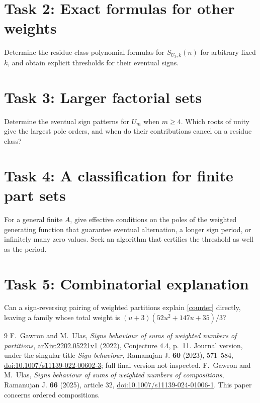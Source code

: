 \documentclass[11pt]{article}
\begin{document}
\section*{Task 2: Exact formulas for other weights}
Determine the residue-class polynomial formulas for
$S_{U_3,k}(n)$ for arbitrary fixed $k$, and obtain explicit thresholds
for their eventual signs.

\section*{Task 3: Larger factorial sets}
Determine the eventual sign patterns for $U_m$ when $m\geq4$.
Which roots of unity give the largest pole orders, and when do
their contributions cancel on a residue class?

\section*{Task 4: A classification for finite part sets}
For a general finite $A$, give effective conditions on the poles
of the weighted generating function that guarantee eventual
alternation, a longer sign period, or infinitely many zero values.
Seek an algorithm that certifies the threshold as well as the period.

\section*{Task 5: Combinatorial explanation}
Can a sign-reversing pairing of weighted partitions explain
\eqref{counter} directly, leaving a family whose total weight is
$(u+3)(52u^2+147u+35)/3$?

\begin{thebibliography}{9}
F.~Gawron and M.~Ulas,
\emph{Signs behaviour of sums of weighted numbers of partitions},
\href{https://arxiv.org/abs/2202.05221}{arXiv:2202.05221v1} (2022),
Conjecture 4.4, p.~11.
Journal version, under the singular title \emph{Sign behaviour},
Ramanujan J. \textbf{60} (2023), 571--584,
\href{https://doi.org/10.1007/s11139-022-00602-3}
{doi:10.1007/s11139-022-00602-3}; full final version not inspected.
F.~Gawron and M.~Ulas,
\emph{Signs behaviour of sums of weighted numbers of compositions},
Ramanujan J. \textbf{66} (2025), article 32,
\href{https://doi.org/10.1007/s11139-024-01006-1}
{doi:10.1007/s11139-024-01006-1}.
This paper concerns ordered compositions.
\end{thebibliography}
\end{document}
